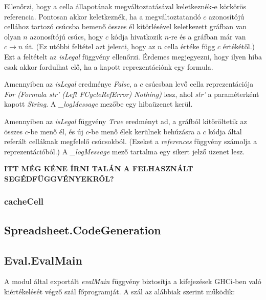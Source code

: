 \begin{compactenum}
	\item Ellenőrzi, hogy a cella állapotának megváltoztatásával keletkeznék-e 		körkörös referencia. Pontosan akkor keletkeznék, ha a megváltoztatandó $c$ 	azonosítójú cellához tartozó csúcsba bemenő összes él kitörlésével keletkezett gráfban van olyan $n$ azonosítójú csúcs, hogy $c$ kódja hivatkozik $n$-re és a gráfban már van $c \rightarrow n$ út. (Ez utóbbi feltétel azt jelenti, hogy az $n$ cella értéke függ $c$ értékétől.) Ezt a feltételt az \textit{isLegal} függvény ellenőrzi. Érdemes megjegyezni, hogy ilyen hiba csak akkor fordulhat elő, ha a kapott reprezentációnk egy formula.
	\item Amennyiben az \textit{isLegal} eredménye \textit{False}, a $c$ csúcsban levő cella reprezentációja \textit{For (Formula str' (Left FCycleRefError) Nothing)} lesz, ahol \textit{str'} a paraméterként kapott \textit{String}. A \textit{\_logMessage} mezőbe egy hibaüzenet kerül.
	\item Amennyiben az \textit{isLegal} függvény \textit{True} eredményt ad, a gráfból kitöröltetik az összes $c$-be menő él, és új $c$-be menő élek kerülnek behúzásra a $c$ kódja által referált celláknak megfelelő csúcsokból. (Ezeket a \textit{references} függvény számolja a reprezentációból.) A \textit{\_logMessage} mező tartalma egy sikert jelző üzenet lesz.
\end{compactenum}

\textbf{ITT MÉG KÉNE ÍRNI TALÁN A FELHASZNÁLT SEGÉDFÜGGVÉNYEKRŐL?}

\subsubsection{cacheCell}

\subsection{Spreadsheet.CodeGeneration}



\subsection{Eval.EvalMain}

A modul által exportált \textit{evalMain} függvény biztosítja a kifejezések GHCi-ben való kiértékelését végző szál főprogramját. A szál az alábbiak szerint működik:


